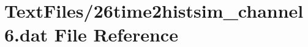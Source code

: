 \hypertarget{26time2histsim__channel6_8dat}{}\section{Text\+Files/26time2histsim\+\_\+channel6.dat File Reference}
\label{26time2histsim__channel6_8dat}
